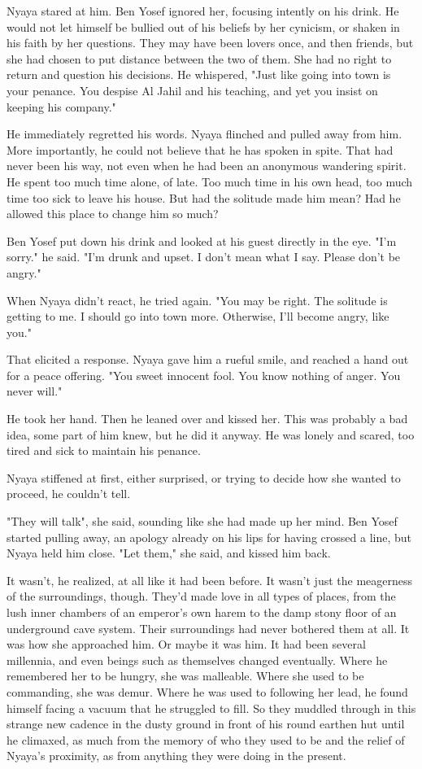 \documentclass{amsart}
\begin{document}
Nyaya stared at him. Ben Yosef ignored her, focusing intently on his drink. He would not let himself be bullied out of his beliefs by her cynicism, or shaken in his faith by her questions. They may have been lovers once, and then friends, but she had chosen to put distance between the two of them. She had no right to return and question his decisions. He whispered, "Just like going into town is your penance. You despise Al Jahil and his teaching, and yet you insist on keeping his company." 

He immediately regretted his words. Nyaya flinched and pulled away from him. More importantly, he could not believe that he has spoken in spite. That had never been his way, not even when he had been an anonymous wandering spirit. He spent too much time alone, of late. Too much time in his own head, too much time too sick to leave his house. But had the solitude made him mean? Had he allowed this place to change him so much?

Ben Yosef put down his drink and looked at his guest directly in the eye. "I'm sorry." he said. "I'm drunk and upset. I don't mean what I say. Please don't be angry."

When Nyaya didn't react, he tried again. "You may be right. The solitude is getting to me. I should go into town more. Otherwise, I'll become angry, like you." 

That elicited a response. Nyaya gave him a rueful smile, and reached a hand out for a peace offering. "You sweet innocent fool. You know nothing of anger. You never will." 

He took her hand. Then he leaned over and kissed her. This was probably a bad idea, some part of him knew, but he did it anyway. He was lonely and scared, too tired and sick to maintain his penance. 

Nyaya stiffened at first, either surprised, or trying to decide how she wanted to proceed, he couldn't tell. 

"They will talk", she said, sounding like she had made up her mind. Ben Yosef started pulling away, an apology already on his lips for having crossed a line, but Nyaya held him close. "Let them," she said, and kissed him back.

It wasn't, he realized, at all like it had been before. It wasn't just the meagerness of the surroundings, though. They'd made love in all types of places, from the lush inner chambers of an emperor's own harem to the damp stony floor of an underground cave system. Their surroundings had never bothered them at all. It was how she approached him. Or maybe it was him. It had been several millennia, and even beings such as themselves changed eventually. Where he remembered her to be hungry, she was malleable. Where she used to be commanding, she was demur. Where he was used to following her lead, he found himself facing a vacuum that he struggled to fill. So they muddled through in this strange new cadence in the dusty ground in front of his round earthen hut until he climaxed, as much from the memory of who they used to be and the relief of Nyaya's proximity, as from anything they were doing in the present. 
\end{document}
